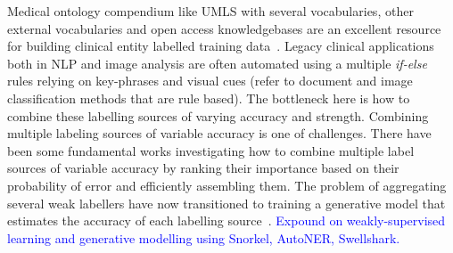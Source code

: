 \documentclass[10.7pt,]{article}
\begin{document}
Medical ontology compendium like UMLS with several vocabularies, other external vocabularies and open access knowledgebases are an excellent resource for building clinical entity labelled training data~\cite{humphreys1998unified}. 
Legacy clinical applications both in NLP and image analysis are often automated using a multiple \textit{if-else} rules relying on key-phrases and visual cues (refer to document and image classification methods that are rule based).
The bottleneck here is how to combine these labelling sources of varying accuracy and strength.
Combining multiple labeling sources of variable accuracy is one of challenges.
There have been some fundamental works investigating how to combine multiple label sources of variable accuracy by ranking their importance based on their probability of error and efficiently assembling them.
The problem of aggregating several weak labellers have now transitioned to training a generative model that estimates the accuracy of each labelling source~\cite{ratner2016data,safranchik2020weakly,lison2021skweak}.
\textcolor{blue}{Expound on weakly-supervised learning and generative modelling using Snorkel, AutoNER, Swellshark.}
\end{document}

